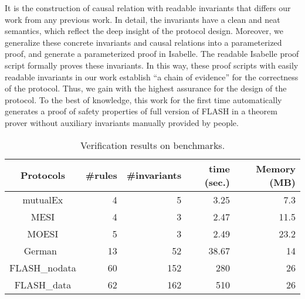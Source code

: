 \documentclass[conference]{IEEEtran}
\newcommand{\forget}[1]{}
\begin{document}
{It is  the construction of causal relation with readable invariants that differs our work from any previous work. In detail, the invariants  have a clean and neat semantics, which reflect the deep insight  of the  protocol design. \forget{We have fully explored  these  in our case study on FLASH protocol \cite{LiCache16}.
 Although these readable invariants  are really needed for the analysis of a protocol, such exploration is seldom discussed in any previous work.}
Moreover, we generalize these concrete invariants and causal relations into a parameterized proof, and  generate a parameterized proof in Isabelle.  The readable Isabelle proof script formally proves these invariants. In this way, these proof scripts with easily readable invariants in our work establish ``a chain of evidence'' for the correctness of the  protocol. Thus, we gain  with the highest assurance for the design of the protocol. To the best of knowledge, this work for the first time automatically generates a proof of safety properties of full version of FLASH in a theorem prover without auxiliary invariants manually provided by people.





\vspace{-5pt}
\begin{table}[!t]
\centering
\caption{\label{Summarization of experiment results}Verification results on benchmarks.}
\vspace{-8pt}
\begin{tabular}{|c|r|r|r|r|}
\hline
Protocols &  \#rules & \#invariants & time (sec.) & Memory (MB) \\
\hline\hline
mutualEx & 4& 5 & 3.25 & 7.3  \\
\hline
MESI & 4& 3 & 2.47 & 11.5  \\
\hline
MOESI &  5& 3 &2.49 & 23.2  \\
\hline
German~\cite{Chou2004} & 13 & 52 & 38.67 & 14  \\
\hline
FLASH\_nodata & 60 & 152 & 280 & 26  \\
\hline
FLASH\_data & 62 & 162 & 510 & 26  \\
\hline
\end{tabular}
\vspace{-5mm}
\vspace{-5pt}\end{table}

}
\end{document}
